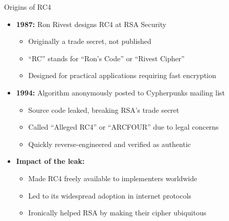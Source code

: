 \documentclass[aspectratio=169, lualatex, handout]{beamer}
\begin{document}
\begin{frame}{Origins of RC4}
	\begin{itemize}[<+->]
		\item \textbf{1987:} Ron Rivest designs RC4 at RSA Security
		      \begin{itemize}[<+->]
			      \item Originally a trade secret, not published
			      \item ``RC'' stands for ``Ron's Code'' or ``Rivest Cipher''
			      \item Designed for practical applications requiring fast encryption
		      \end{itemize}
		\item \textbf{1994:} Algorithm anonymously posted to Cypherpunks mailing list
		      \begin{itemize}[<+->]
			      \item Source code leaked, breaking RSA's trade secret
			      \item Called ``Alleged RC4'' or ``ARCFOUR'' due to legal concerns
			      \item Quickly reverse-engineered and verified as authentic
		      \end{itemize}
		\item \textbf{Impact of the leak:}
		      \begin{itemize}[<+->]
			      \item Made RC4 freely available to implementers worldwide
			      \item Led to its widespread adoption in internet protocols
			      \item Ironically helped RSA by making their cipher ubiquitous
		      \end{itemize}
	\end{itemize}
\end{frame}
\end{document}
